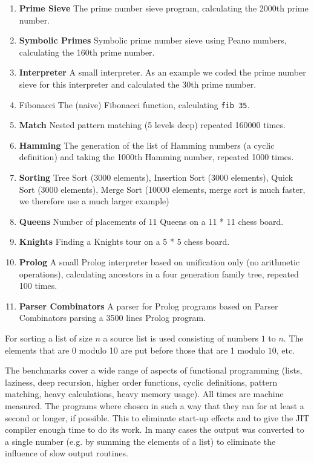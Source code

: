 \begin{enumerate}
\item {\bf \textsf{Prime Sieve}} The prime number sieve program, calculating the 2000th
prime number.
\item {\bf \textsf{Symbolic Primes}} Symbolic prime number sieve using Peano numbers,
calculating the 160th prime number.
\item {\bf \textsf{Interpreter}} A small \Sapl  interpreter. As an example we coded the prime
number sieve for this interpreter and calculated the 30th prime number.
\item { \textsf{Fibonacci}} The (naive) Fibonacci function, calculating \texttt{fib 35}.
\item {\bf \textsf{Match}} Nested pattern matching (5 levels deep) repeated 160000 times.
\item {\bf \textsf{Hamming}} The generation of the list of Hamming numbers (a cyclic
definition) and taking the 1000th Hamming number, repeated 1000 times.
\item {\bf \textsf{Sorting}} Tree Sort (3000 elements), Insertion Sort (3000 elements), Quick Sort (3000 elements), 
Merge Sort (10000 elements, merge sort is much faster, we therefore use a much larger example)
\item {\bf \textsf{Queens}} Number of placements of 11 Queens on a 11 * 11 chess board.
\item {\bf \textsf{Knights}} Finding a Knights tour on a 5 * 5 chess board.
\item {\bf \textsf{Prolog}} A small Prolog interpreter based on unification only (no
arithmetic operations), calculating ancestors in a four generation family tree,
repeated 100 times.
\item {\bf \textsf{Parser Combinators}} A parser for Prolog programs based on Parser
Combinators parsing a 3500 lines Prolog program.
\end{enumerate}
%
For sorting a list of size $n$ a source list is  used consisting of numbers $1$
to $n$. The elements that are 0 modulo 10 are put before those that are 1 modulo
$10$, etc.

The benchmarks cover a wide range of aspects of functional programming (lists, laziness, 
deep recursion, higher order functions, cyclic definitions, pattern matching, 
heavy calculations, heavy memory usage).
All times are machine measured. The programs where chosen in such a way that
they ran for at least a second or longer, if possible. This to eliminate start-up 
effects and to give the \textsf{JIT} compiler enough time to do its work. 
In many cases the output was converted to a single number (e.g. 
by summing the elements of a list) to eliminate the influence of slow output 
routines.

